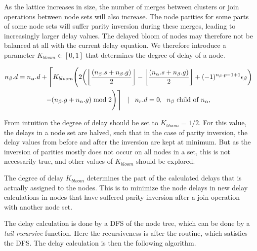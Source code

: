 As the lattice increases in size, the number of merges between clusters or join operations between node sets will also increase. The node parities for some parts of some node sets will suffer parity inversion during these merges, leading to increasingly larger delay values. The delayed bloom of nodes may therefore not be balanced at all with the current delay equation. We therefore introduce a parameter $K_{bloom} \in [0, 1]$ that determines the degree of delay of a node.

\begin{multline}\label{eq:delayequation}
  n_\beta.d = n_\alpha.d + \Bigg \lceil K_{bloom} \Bigg( 2\bigg({\left \lfloor \frac{(n_\beta.s+n_\beta.g)}{2} \right \rfloor } - {\left \lfloor \frac{(n_\alpha.s+n_\beta.g)}{2} \right \rfloor } + (-1)^{n_\beta.p-1+1}\epsilon_\beta\bigg) \\
   - (n_\beta.g + n_\alpha.g)\bmod 2 \Bigg) \Bigg \rceil \hspace{.3cm} | \hspace{.3cm} n_r.d = 0, \hspace{.2cm} n_\beta \mbox{ child of } n_\alpha,
\end{multline}

From intuition the degree of delay should be set to $K_{bloom} = 1/2$. For this value, the delays in a node set are halved, such that in the case of parity inversion, the delay values from before and after the inversion are kept at minimum. But as the inversion of parities mostly does not occur on all nodes in a set, this is not necessarily true, and other values of $K_{bloom}$ should be explored.

\begin{lemma}
  The degree of delay $K_{bloom}$ determines the part of the calculated delays that is actually assigned to the nodes. This is to minimize the node delays in new delay calculations in nodes that have suffered parity inversion after a join operation with another node set.
\end{lemma}

The delay calculation is done by a DFS of the node tree, which can be done by a \emph{tail recursive} function. Here the recursiveness is after the routine, which satisfies the DFS. The delay calculation is then the following algorithm.

\begin{algo}[algotitle=CalcDelay, label=al:calcdelay]
\begin{algorithm}[H]

\KwData{\node, \cluster}

\BlankLine

\end{algorithm}
\end{algo}


